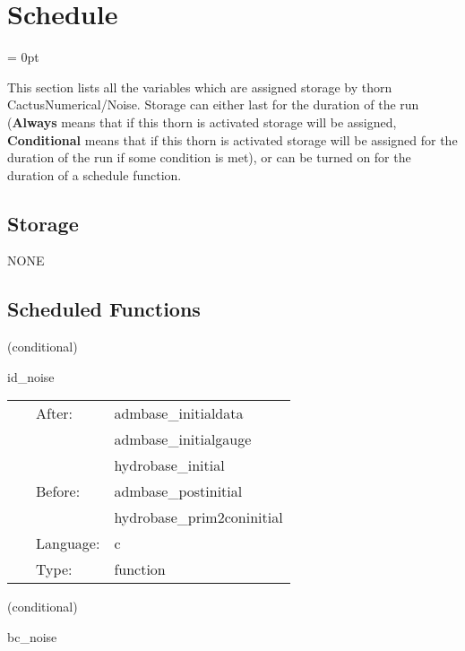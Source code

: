 
\section{Schedule} 


\parskip = 0pt


\noindent This section lists all the variables which are assigned storage by thorn CactusNumerical/Noise.  Storage can either last for the duration of the run ({\bf Always} means that if this thorn is activated storage will be assigned, {\bf Conditional} means that if this thorn is activated storage will be assigned for the duration of the run if some condition is met), or can be turned on for the duration of a schedule function.


\subsection*{Storage}NONE
\subsection*{Scheduled Functions}
\vspace{5mm}

   (conditional) 

\hspace{5mm} id\_noise 

\hspace{5mm}{\it add noise to initial data } 


\hspace{5mm}

 \begin{tabular*}{160mm}{cll} 
~ & After:  & admbase\_initialdata \\ 
~& ~ &admbase\_initialgauge\\ 
~& ~ &hydrobase\_initial\\ 
~ & Before:  & admbase\_postinitial \\ 
~& ~ &hydrobase\_prim2coninitial\\ 
~ & Language:  & c \\ 
~ & Type:  & function \\ 
\end{tabular*} 


\vspace{5mm}

   (conditional) 

\hspace{5mm} bc\_noise 

